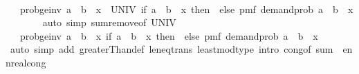 \begin{isabellebody}
\ \isamarkupfalse%
\ {\isachardoublequoteopen}{\isasymdots}\ {\isacharequal}{\kern0pt}\ prob{\isacharunderscore}{\kern0pt}ge{\isacharunderscore}{\kern0pt}inv\ {\isacharparenleft}{\kern0pt}a\ {\isacharplus}{\kern0pt}\ b{\isacharparenright}{\kern0pt}\ {\isacharplus}{\kern0pt}\ {\isacharparenleft}{\kern0pt}{\isasymSum}x\ {\isasymin}\ UNIV{\isacharminus}{\kern0pt}{\isacharbraceleft}{\kern0pt}{}{\isacharbraceright}{\kern0pt}{\isachardot}{\kern0pt}\ {\isacharparenleft}{\kern0pt}if\ a\ {\isacharplus}{\kern0pt}\ b\ {\isacharless}{\kern0pt}\ x\ then\ {}\ else\ pmf\ demand{\isacharunderscore}{\kern0pt}prob\ {\isacharparenleft}{\kern0pt}a\ {\isacharplus}{\kern0pt}\ b\ {\isacharminus}{\kern0pt}\ x{\isacharparenright}{\kern0pt}{\isacharparenright}{\kern0pt}{\isacharparenright}{\kern0pt}{\isachardoublequoteclose}\isanewline
\ \ \ \ \ \ \isamarkupfalse%
\ {\isacharparenleft}{\kern0pt}auto\ simp{\isacharcolon}{\kern0pt}\ sum{\isachardot}{\kern0pt}remove{\isacharbrackleft}{\kern0pt}of\ UNIV\ {}{\isacharbrackright}{\kern0pt}{\isacharparenright}{\kern0pt}\isanewline
\ \ \ \ \isamarkupfalse%
\ \isamarkupfalse%
\ {\isachardoublequoteopen}{\isasymdots}\ {\isacharequal}{\kern0pt}\ prob{\isacharunderscore}{\kern0pt}ge{\isacharunderscore}{\kern0pt}inv\ {\isacharparenleft}{\kern0pt}a\ {\isacharplus}{\kern0pt}\ b{\isacharparenright}{\kern0pt}\ {\isacharplus}{\kern0pt}\ {\isacharparenleft}{\kern0pt}{\isasymSum}x{\isasymin}{\isacharbraceleft}{\kern0pt}{}{\isacharless}{\kern0pt}{\isachardot}{\kern0pt}{\isachardot}{\kern0pt}{\isacharbraceright}{\kern0pt}{\isachardot}{\kern0pt}\ {\isacharparenleft}{\kern0pt}if\ a\ {\isacharplus}{\kern0pt}\ b\ {\isacharless}{\kern0pt}\ x\ then\ {}\ else\ pmf\ demand{\isacharunderscore}{\kern0pt}prob\ {\isacharparenleft}{\kern0pt}a\ {\isacharplus}{\kern0pt}\ b\ {\isacharminus}{\kern0pt}\ x{\isacharparenright}{\kern0pt}{\isacharparenright}{\kern0pt}{\isacharparenright}{\kern0pt}{\isachardoublequoteclose}\isanewline
\ \ \ \ \ \ \isamarkupfalse%
\ {\isacharparenleft}{\kern0pt}auto\ simp\ add{\isacharcolon}{\kern0pt}\ greaterThan{\isacharunderscore}{\kern0pt}def\ le{\isacharunderscore}{\kern0pt}neq{\isacharunderscore}{\kern0pt}trans\ least{\isacharunderscore}{\kern0pt}mod{\isacharunderscore}{\kern0pt}type\ intro{\isacharbang}{\kern0pt}{\isacharcolon}{\kern0pt}\ cong{\isacharbrackleft}{\kern0pt}of\ {\isachardoublequoteopen}sum\ {\isacharunderscore}{\kern0pt}{\isachardoublequoteclose}{\isacharbrackright}{\kern0pt}\ ennreal{\isacharunderscore}{\kern0pt}cong{\isacharparenright}{\kern0pt}\isanewline

\end{isabellebody}
